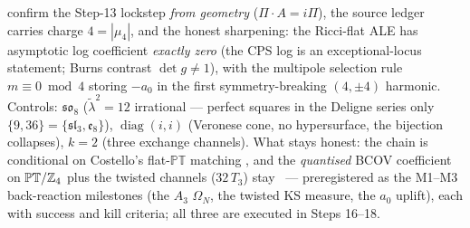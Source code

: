 confirm the Step-13 lockstep \emph{from geometry} ($\Pi\cdot A=i\Pi$), the source ledger carries
charge $4=|\mu_4|$, and the honest sharpening: the Ricci-flat ALE has asymptotic log coefficient
\emph{exactly zero} (the CPS log is an exceptional-locus statement; Burns contrast
$\det g\neq1$), with the multipole selection rule $m\equiv0\bmod4$ storing $-a_0$ in the first
symmetry-breaking $(4,\pm4)$ harmonic. Controls: $\mathfrak{so}_8$ ($\tilde\lambda^2=12$
irrational --- perfect squares in the Deligne series only $\{9,36\}=\{\mathfrak{sl}_3,
\mathfrak e_8\}$), $\operatorname{diag}(i,i)$ (Veronese cone, no hypersurface, the bijection
collapses), $k=2$ (three exchange channels). What stays honest: the chain is conditional on
Costello's flat-$\mathbb{PT}$ matching \mC, and the \emph{quantised} BCOV coefficient on
$\mathbb{PT}/\mathbb{Z}_4$ plus the twisted channels ($32\,T_3$) stay \mO\ --- preregistered as the
M1--M3 back-reaction milestones (the $A_3$ $\Omega_N$, the twisted KS measure, the $a_0$
uplift), each with success and kill criteria; all three are executed in Steps 16--18.
